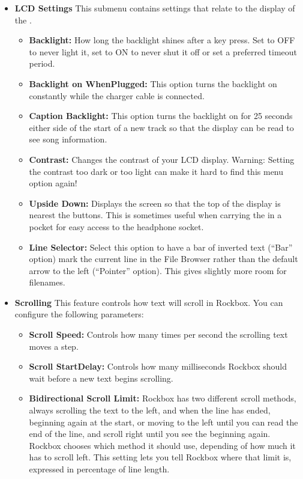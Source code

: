 \begin{itemize}
\begin{itemize}
\item \textbf{LCD Settings}
  This submenu contains settings that relate to the display of the \dap.
  \begin{itemize}
  \item \textbf{Backlight:} 
    How long the backlight shines after a key press. Set to OFF to never light it, set to ON to never shut it off or set a preferred timeout period.
  \item \textbf{Backlight on WhenPlugged:}
    This option turns the backlight on constantly while the charger cable is connected.
  \item \textbf{Caption Backlight:} This option turns the backlight on for 25 seconds either side of the start of a new track so that the display can be read to see song information.
  \item \textbf{Contrast:} Changes the contrast of your LCD display. Warning: Setting the contrast too dark or too light can make it hard to find this menu option again!
  \item \textbf{Upside Down: }Displays the screen so that the top of the display is nearest the buttons.  This is sometimes useful when carrying the \dap in a pocket for easy access to the headphone socket.
  \item \textbf{Line Selector: }Select this option to have a bar of inverted text (``Bar'' option) mark the current line in the File Browser rather than the default arrow to the left (``Pointer'' option).  This gives slightly more room for filenames.
  \end{itemize}

\item \textbf{Scrolling}
  This feature controls how text will scroll in Rockbox. You can configure the following parameters:
  \begin{itemize}
  \item \textbf{Scroll Speed:} 
    Controls how many times per second the scrolling text moves a step.
  \item \textbf{Scroll StartDelay:} 
    Controls how many milliseconds Rockbox should wait before a new text begins scrolling.
  \item \textbf{Bidirectional Scroll Limit: }
    Rockbox has two different scroll methods,  always scrolling the text to the left, and when the line has ended, beginning again at the start, or moving to the left until you can read the end of the line, and scroll right until you see the beginning again. Rockbox chooses which method it should use, depending of how much it has to scroll left. This setting lets you tell Rockbox where that limit is, expressed in percentage of line length.
  \end{itemize}
  

\end{itemize}
\end{itemize}
